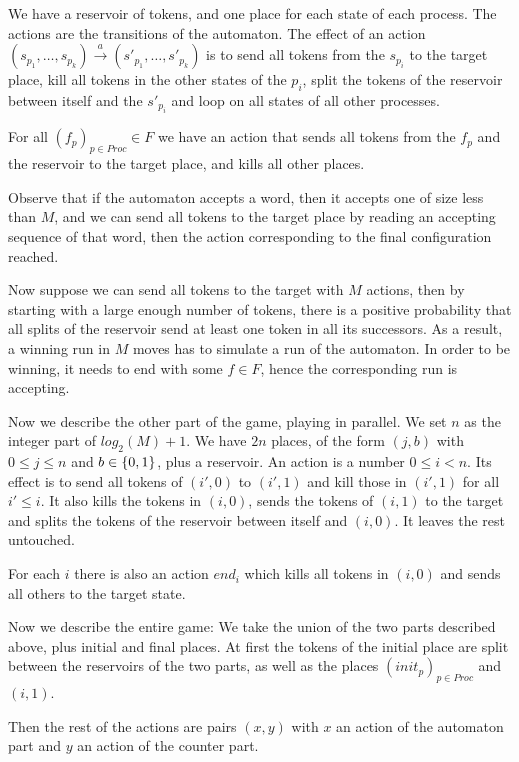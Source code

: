 \documentclass{article}
\begin{document}
We have a reservoir of tokens, and one place for each state of each process.
The actions are the transitions of the automaton. The effect of an action $(s_{p_1}, \ldots, s_{p_k}) \xrightarrow{a} (s'_{p_1}, \ldots, s'_{p_k})$ is to send all tokens from the $s_{p_i}$ to the target place, kill all tokens in the other states of the $p_i$, split the tokens of the reservoir between itself and the $s'_{p_i}$ and loop on all states of all other processes.

For all $(f_p)_{p \in Proc} \in F$ we have an action that sends all tokens from the $f_p$ and the reservoir to the target place, and kills all other places. 

Observe that if the automaton accepts a word, then it accepts one of size less than $M$, and we can send all tokens to the target place by reading an accepting sequence of that word, then the action corresponding to the final configuration reached.  

Now suppose we can send all tokens to the target with $M$ actions, then by starting with a large enough number of tokens, there is a positive probability that all splits of the reservoir send at least one token in all its successors. As a result, a winning run in $M$ moves has to simulate a run of the automaton. 
In order to be winning, it needs to end with some $f \in F$, hence the corresponding run is accepting. 

Now we describe the other part of the game, playing in parallel.
We set $n$ as the integer part of $log_2(M)+1$. We have $2n$ places, of the form $(j,b)$ with $0 \leq j \leq  n$ and $b \in \{ 0,1 \}$, plus a reservoir.
An action is a number $0\leq i < n$. Its effect is to send all tokens of $(i', 0)$ to $(i', 1)$ and kill those in $(i',1)$ for all $i'\leq i$. It also kills the tokens in $(i,0)$, sends the tokens of $(i,1)$ to the target and splits the tokens of the reservoir between itself and $(i,0)$. It leaves the rest untouched.

For each $i$ there is also an action $end_i$ which kills all tokens in $(i,0)$ and sends all others to the target state.

Now we describe the entire game: We take the union of the two parts described above, plus initial and final places. At first the tokens of the initial place are split between the reservoirs of the two parts, as well as the places $(init_p)_{p \in Proc}$ and $(i,1)$.

Then the rest of the actions are pairs $(x,y)$ with $x$ an action of the automaton part and $y$ an action of the counter part.
\end{document}
